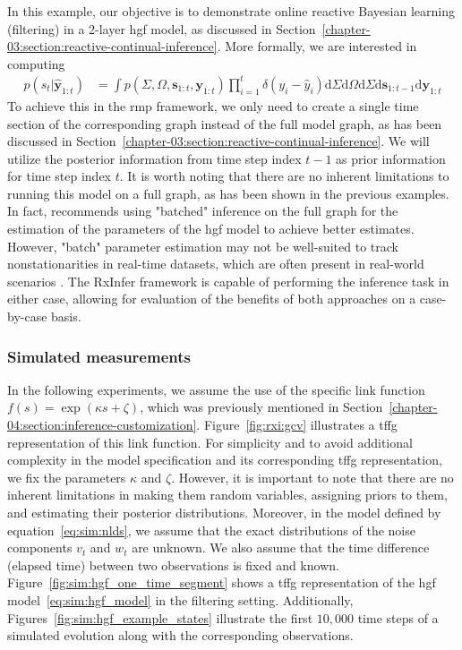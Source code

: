 In this example, our objective is to demonstrate online reactive Bayesian learning (filtering)
in a 2-layer \ac{hgf} model, as discussed in
Section~\ref{chapter-03:section:reactive-continual-inference}. More formally, we are interested in computing 
\begin{equation}
    \begin{split}
        p(s_t\vert \hat{\bm{y}}_{1:t}) &= \int p(\Sigma, \Omega, \bm{s}_{1:t}, \bm{y}_{1:t}) \prod_{i = 1}^{t}\delta(y_i - \hat{y}_i)\mathrm{d}\Sigma\mathrm{d}\Omega\mathrm{d}\Sigma\mathrm{d}\bm{s}_{1:t-1}\mathrm{d}\bm{y}_{1:t}
    \end{split}
\end{equation}
To achieve this in the \ac{rmp} framework, we only need to create a single time section of the corresponding graph instead of the full model graph, as has been discussed in Section~\ref{chapter-03:section:reactive-continual-inference}.
We will utilize the posterior information from time step index $t - 1$ as prior information for time
step index $t$.
It is worth noting that there are no inherent limitations to running this model on a full
graph, as has been shown in the previous examples.
In fact, \citep{mathys_hierarchical_2012} recommends using "batched" inference on the full
graph for the estimation of the parameters of the \ac{hgf} model to achieve better estimates.
However, "batch" parameter estimation may not be well-suited to track nonstationarities in real-time datasets, which are often present in real-world scenarios \citep{senoz_thesis, senoz_switching_2021}. 
The RxInfer framework is capable of performing the inference task in either case, allowing for
evaluation of the benefits of both approaches on a case-by-case basis.

\subsubsection*{Simulated measurements}

In the following experiments, we assume the use of the specific link function $f(s) =
  \exp(\kappa s + \zeta)$, which was previously mentioned in
Section~\ref{chapter-04:section:inference-customization}.
Figure~\ref{fig:rxi:gcv} illustrates a \ac{tffg} representation of this link function.
For simplicity and to avoid additional complexity in the model specification and its
corresponding \ac{tffg} representation, we fix the parameters $\kappa$ and $\zeta$.
However, it is important to note that there are no inherent limitations in making them random
variables, assigning priors to them, and estimating their posterior distributions.
Moreover, in the model defined by equation~\eqref{eq:sim:nlds}, we assume that the exact
distributions of the noise components $v_t$ and $w_t$ are unknown.
We also assume that the time difference (elapsed time) between two observations is fixed and known.
Figure~\ref{fig:sim:hgf_one_time_segment} shows a \ac{tffg} representation of the \ac{hgf} model~\eqref{eq:sim:hgf_model} in the filtering setting.
Additionally, Figures~\ref{fig:sim:hgf_example_states} illustrate the first $10,000$ time
steps of a simulated evolution along with the corresponding observations.

